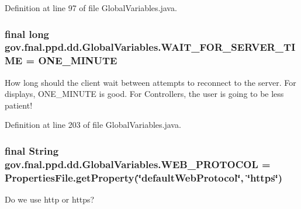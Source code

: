 Definition at line 97 of file Global\-Variables.\-java.

\hypertarget{classgov_1_1fnal_1_1ppd_1_1dd_1_1GlobalVariables_a7ffc604df353f97f39c5c9734c45fb38}{
\subsubsection[{W\-A\-I\-T\-\_\-\-F\-O\-R\-\_\-\-S\-E\-R\-V\-E\-R\-\_\-\-T\-I\-M\-E}]{\setlength{\rightskip}{0pt plus 5cm}final long gov.\-fnal.\-ppd.\-dd.\-Global\-Variables.\-W\-A\-I\-T\-\_\-\-F\-O\-R\-\_\-\-S\-E\-R\-V\-E\-R\-\_\-\-T\-I\-M\-E = {\bf O\-N\-E\-\_\-\-M\-I\-N\-U\-T\-E}\hspace{0.3cm}{\ttfamily [static]}}}\label{classgov_1_1fnal_1_1ppd_1_1dd_1_1GlobalVariables_a7ffc604df353f97f39c5c9734c45fb38}
How long should the client wait between attempts to reconnect to the server. For displays, O\-N\-E\-\_\-\-M\-I\-N\-U\-T\-E is good. For Controllers, the user is going to be less patient! 

Definition at line 203 of file Global\-Variables.\-java.

\hypertarget{classgov_1_1fnal_1_1ppd_1_1dd_1_1GlobalVariables_aa3bf05d555f0c3489c60664ae54a2480}{
\subsubsection[{W\-E\-B\-\_\-\-P\-R\-O\-T\-O\-C\-O\-L}]{\setlength{\rightskip}{0pt plus 5cm}final String gov.\-fnal.\-ppd.\-dd.\-Global\-Variables.\-W\-E\-B\-\_\-\-P\-R\-O\-T\-O\-C\-O\-L = {\bf Properties\-File.\-get\-Property}(\char`\"{}default\-Web\-Protocol\char`\"{}, \char`\"{}https\char`\"{})\hspace{0.3cm}{\ttfamily [static]}}}\label{classgov_1_1fnal_1_1ppd_1_1dd_1_1GlobalVariables_aa3bf05d555f0c3489c60664ae54a2480}
Do we use http or https? 

